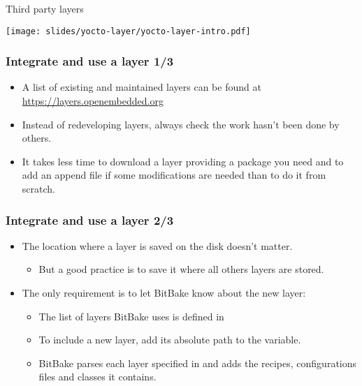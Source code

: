 \begin{frame}{Third party layers}
  \begin{center}
    \texttt{[image: slides/yocto-layer/yocto-layer-intro.pdf]}
  \end{center}
\end{frame}

\begin{frame}
  \frametitle{Integrate and use a layer 1/3}
  \begin{itemize}
    \item A list of existing and maintained layers can be found at
      \url{https://layers.openembedded.org}
    \item Instead of redeveloping layers, always check the work hasn't
      been done by others.
    \item It takes less time to download a layer providing a package
      you need and to add an append file if some modifications are
      needed than to do it from scratch.
  \end{itemize}
\end{frame}

\begin{frame}
  \frametitle{Integrate and use a layer 2/3}
  \begin{itemize}
    \item The location where a layer is saved on the disk doesn't
      matter.
    \begin{itemize}
      \item But a good practice is to save it where all others layers
        are stored.
    \end{itemize}
    \item The only requirement is to let BitBake know about the new
          layer:
    \begin{itemize}
      \item The list of layers BitBake uses is defined in
      \item To include a new layer, add its absolute path to the
         variable.
      \item BitBake parses each layer specified in  and
        adds the recipes, configurations files and classes it
        contains.
    \end{itemize}
  \end{itemize}
\end{frame}


